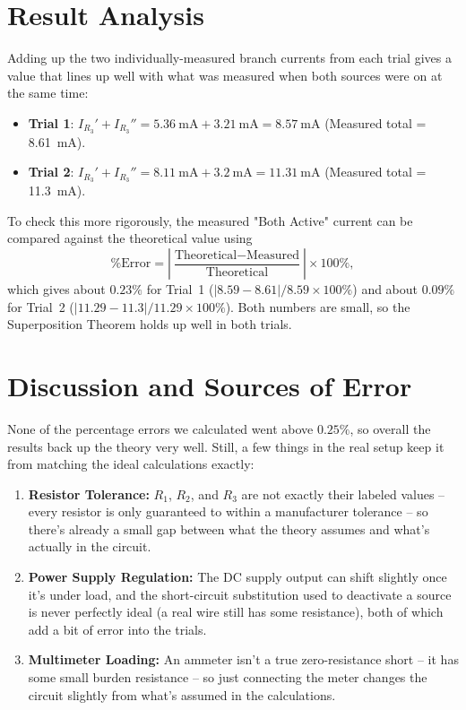 \section{Result Analysis}
Adding up the two individually-measured branch currents from each trial gives a value that lines up well with what was measured when both sources were on at the same time:
\begin{itemize}
    \item \textbf{Trial 1}: $I_{R_3}' + I_{R_3}'' = \qty{5.36}{\milli\ampere} + \qty{3.21}{\milli\ampere} = \qty{8.57}{\milli\ampere}$ (Measured total = \qty{8.61}{\milli\ampere}).
    \item \textbf{Trial 2}: $I_{R_3}' + I_{R_3}'' = \qty{8.11}{\milli\ampere} + \qty{3.2}{\milli\ampere} = \qty{11.31}{\milli\ampere}$ (Measured total = \qty{11.3}{\milli\ampere}).
\end{itemize}
To check this more rigorously, the measured "Both Active" current can be compared against the theoretical value using
\[
\text{\% Error} = \left|\frac{\text{Theoretical}-\text{Measured}}{\text{Theoretical}}\right|\times100\%,
\]
which gives about $0.23\%$ for Trial~1 ($|8.59-8.61|/8.59\times100\%$) and about $0.09\%$ for Trial~2 ($|11.29-11.3|/11.29\times100\%$). Both numbers are small, so the Superposition Theorem holds up well in both trials.

\section{Discussion and Sources of Error}
None of the percentage errors we calculated went above $0.25\%$, so overall the results back up the theory very well. Still, a few things in the real setup keep it from matching the ideal calculations exactly:
\begin{enumerate}
    \item \textbf{Resistor Tolerance:} $R_1$, $R_2$, and $R_3$ are not exactly their labeled values -- every resistor is only guaranteed to within a manufacturer tolerance -- so there's already a small gap between what the theory assumes and what's actually in the circuit.
    \item \textbf{Power Supply Regulation:} The DC supply output can shift slightly once it's under load, and the short-circuit substitution used to deactivate a source is never perfectly ideal (a real wire still has some resistance), both of which add a bit of error into the trials.
    \item \textbf{Multimeter Loading:} An ammeter isn't a true zero-resistance short -- it has some small burden resistance -- so just connecting the meter changes the circuit slightly from what's assumed in the calculations.
\end{enumerate}

